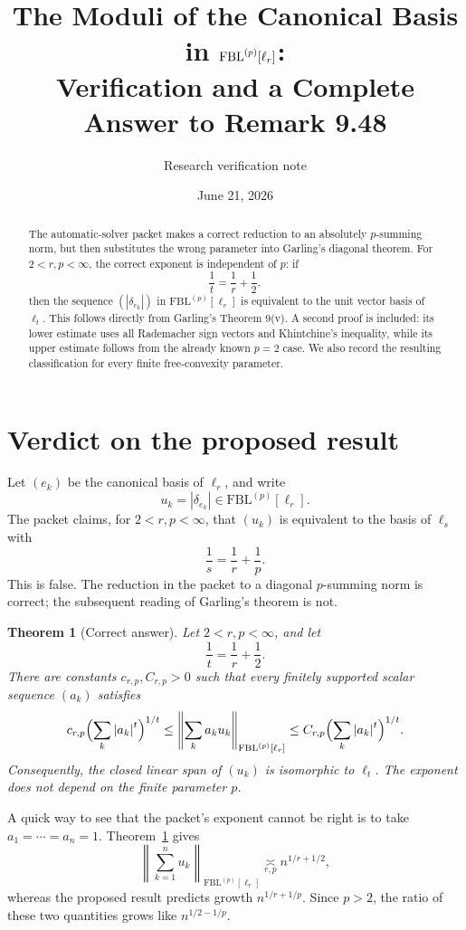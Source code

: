 \documentclass[11pt]{article}
\title{The Moduli of the Canonical Basis in
\texorpdfstring{$\FBL^{(p)}[\ell_r]$}{FBL(p)[ell-r]}:\\
Verification and a Complete Answer to Remark 9.48}
\author{Research verification note}
\date{June 21, 2026}
\newtheorem{theorem}{Theorem}
\theoremstyle{remark}
\newcommand{\FBL}{\mathrm{FBL}}
\newcommand{\norm}[1]{\left\lVert #1\right\rVert}
\newcommand{\abs}[1]{\left\lvert #1\right\rvert}
\newcommand{\asympC}[1]{\mathrel{\underset{#1}{\asymp}}}
\begin{document}
\maketitle

\begin{abstract}
The automatic-solver packet makes a correct reduction to an absolutely
$p$-summing norm, but then substitutes the wrong parameter into Garling's
diagonal theorem.  For $2<r,p<\infty$, the correct exponent is independent
of $p$: if
\[
  \frac1t=\frac1r+\frac12,
\]
then the sequence $(\abs{\delta_{e_k}})$ in $\FBL^{(p)}[\ell_r]$ is
equivalent to the unit vector basis of $\ell_t$.  This follows directly
from Garling's Theorem 9(v).  A second proof is included: its lower estimate
uses all Rademacher sign vectors and Khintchine's inequality, while its
upper estimate follows from the already known $p=2$ case.  We also record
the resulting classification for every finite free-convexity parameter.
\end{abstract}

\section{Verdict on the proposed result}

Let $(e_k)$ be the canonical basis of $\ell_r$, and write
\[
  u_k=\abs{\delta_{e_k}}\in \FBL^{(p)}[\ell_r].
\]
The packet claims, for $2<r,p<\infty$, that $(u_k)$ is equivalent to the
basis of $\ell_s$ with
\[
  \frac1s=\frac1r+\frac1p.
\]
This is false.  The reduction in the packet to a diagonal $p$-summing norm
is correct; the subsequent reading of Garling's theorem is not.

\begin{theorem}[Correct answer]
\label{thm:main}
Let $2<r,p<\infty$, and let
\[
  \frac1t=\frac1r+\frac12.
\]
There are constants $c_{r,p},C_{r,p}>0$ such that every finitely supported
scalar sequence $(a_k)$ satisfies
\[
 c_{r,p}\Bigl(\sum_k \abs{a_k}^{t}\Bigr)^{1/t}
 \le
 \norm{\sum_k a_k u_k}_{\FBL^{(p)}[\ell_r]}
 \le
 C_{r,p}\Bigl(\sum_k \abs{a_k}^{t}\Bigr)^{1/t}.
\]
Consequently, the closed linear span of $(u_k)$ is isomorphic to $\ell_t$.
The exponent does not depend on the finite parameter $p$.
\end{theorem}

A quick way to see that the packet's exponent cannot be right is to take
$a_1=\cdots=a_n=1$.  Theorem~\ref{thm:main} gives
\[
 \norm{\sum_{k=1}^n u_k}_{\FBL^{(p)}[\ell_r]}
 \asympC{r,p} n^{1/r+1/2},
\]
whereas the proposed result predicts growth $n^{1/r+1/p}$.  Since $p>2$,
the ratio of these two quantities grows like $n^{1/2-1/p}$.
\end{document}
